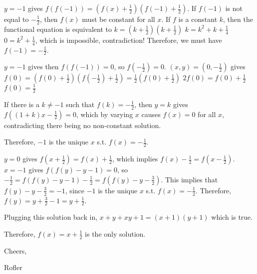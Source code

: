 \begin{solution}
	$y=-1$ gives $f(f(-1))=(f(x)+\frac{1}{2})(f(-1)+\frac{1}{2})$.
If $f(-1)$ is not equal to $-\frac{1}{2}$, then $f(x)$ must be constant for all $x$. If $f$ is a constant $k$, then the functional equation is equivalent to
$k=(k+\frac{1}{2})(k+\frac{1}{2})$
$k=k^2+k+\frac{1}{4}$
$0=k^2+\frac{1}{4}$, which is impossible, contradiction! Therefore, we must have $f(-1)=-\frac{1}{2}$.

$y=-1$ gives then $f(f(-1))=0$, so $f(-\frac{1}{2})=0$.
$(x,y)=(0,-\frac{1}{2})$ gives
$f(0)=(f(0)+\frac{1}{2})(f(-\frac{1}{2})+\frac{1}{2})=\frac{1}{2}(f(0)+\frac{1}{2})$
$2f(0)=f(0)+\frac{1}{2}$
$f(0)=\frac{1}{2}$

If there is a $k \ne -1$ such that $f(k)=-\frac{1}{2}$, then $y=k$ gives $f((1+k)x-\frac{1}{2})=0$, which by varying $x$ causes $f(x)=0$ for all $x$, contradicting there being no non-constant solution.

Therefore, $-1$ is the unique $x$ s.t. $f(x)=-\frac{1}{2}$.

$y=0$ gives $f(x+\frac{1}{2})=f(x)+\frac{1}{2}$, which implies $f(x)-\frac{1}{2}=f(x-\frac{1}{2})$.
$x=-1$ gives $f(f(y)-y-1)=0$, so $-\frac{1}{2}=f(f(y)-y-1)-\frac{1}{2}=f(f(y)-y-\frac{3}{2})$.
This implies that $f(y)-y-\frac{3}{2}=-1$, since $-1$ is the unique $x$ s.t. $f(x)=-\frac{1}{2}$.
Therefore, $f(y)=y+\frac{3}{2}-1=y+\frac{1}{2}$.

Plugging this solution back in, $x+y+xy+1=(x+1)(y+1)$ which is true.

Therefore, $f(x)=x+\frac{1}{2}$ is the only solution.

Cheers,

Rofler
\end{solution}



